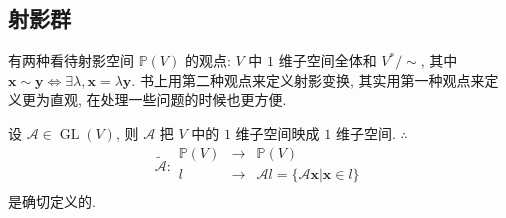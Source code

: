 \documentclass{ctexart}
\begin{document}
\subsection{射影群}
有两种看待射影空间 $\mathbb{P}(V)$ 的观点: $V$ 中 $1$ 维子空间全体和 $V^*/\sim$, 其中 $\boldsymbol{x}\sim\boldsymbol{y}\Leftrightarrow\exists\lambda,\boldsymbol{x}=\lambda\boldsymbol{y}$. 书上用第二种观点来定义射影变换, 其实用第一种观点来定义更为直观, 在处理一些问题的时候也更方便.

设 $\mathcal{A}\in\operatorname{GL}(V)$, 则 $\mathcal{A}$ 把 $V$ 中的 $1$ 维子空间映成 $1$ 维子空间. $\therefore$
\[\widetilde{\mathcal{A}}:\begin{array}{rcl}
    \mathbb{P}(V) & \to & \mathbb{P}(V) \\
    l & \to & \mathcal{A}l=\{\mathcal{A}\boldsymbol{x}|\boldsymbol{x}\in l\} \\
\end{array}\]
是确切定义的.
\end{document}
